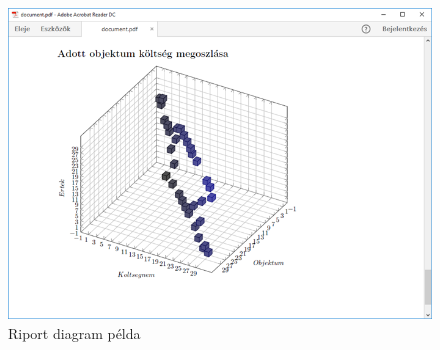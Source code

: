  \begin{figure}[!ht]
\centering
\includegraphics[width=120mm, keepaspectratio]{figures/Report.png}
\caption{Riport diagram példa} 
\label{fig:Overview}
\end{figure}





